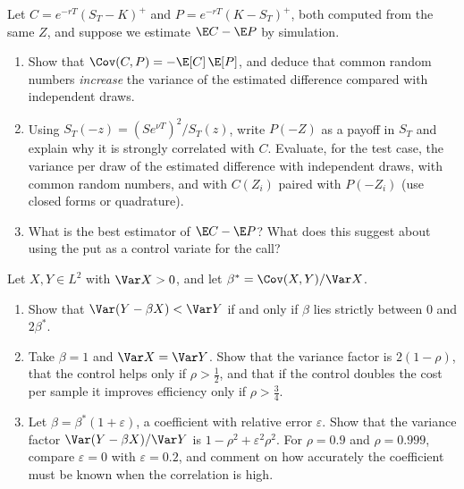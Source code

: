 \begin{exercise}\label{ex:cv-crn-parity}
\medium Let $C=e^{-rT}(S_T-K)^+$ and $P=e^{-rT}(K-S_T)^+$, both computed from the same
$Z$, and suppose we estimate $\E C-\E P$ by simulation.
\begin{enumerate}[label=(\alph*)]
  \item Show that $\Cov(C,P)=-\E[C]\,\E[P]$, and deduce that common random numbers
    \emph{increase} the variance of the estimated difference compared with independent draws.
  \item Using $S_T(-z)=(Se^{\nu T})^2/S_T(z)$, write $P(-Z)$ as a payoff in $S_T$ and explain why
    it is strongly correlated with $C$. Evaluate, for the test case, the variance per draw of
    the estimated difference with independent draws, with common random numbers, and with
    $C(Z_i)$ paired with $P(-Z_i)$ (use closed forms or quadrature).
  \item What is the best estimator of $\E C-\E P$? What does this suggest about using the
    put as a control variate for the call?
\end{enumerate}
\end{exercise}

\begin{exercise}\label{ex:cv-fixed-beta}
\easy Let $X,Y\in L^2$ with $\Var X>0$, and let $\beta^*=\Cov(X,Y)/\Var X$.
\begin{enumerate}[label=(\alph*)]
  \item Show that $\Var(Y-\beta X)<\Var Y$ if and only if $\beta$ lies strictly between $0$
    and $2\beta^*$.
  \item Take $\beta=1$ and $\Var X=\Var Y$. Show that the variance factor is $2(1-\rho)$, that
    the control helps only if $\rho>\frac12$, and that if the control doubles the cost per
    sample it improves efficiency only if $\rho>\frac34$.
  \item Let $\beta=\beta^*(1+\varepsilon)$, a coefficient with relative error $\varepsilon$. Show
    that the variance factor $\Var(Y-\beta X)/\Var Y$ is $1-\rho^2+\varepsilon^2\rho^2$. For
    $\rho=0.9$ and $\rho=0.999$, compare $\varepsilon=0$ with $\varepsilon=0.2$, and comment on how
    accurately the coefficient must be known when the correlation is high.
\end{enumerate}
\end{exercise}

